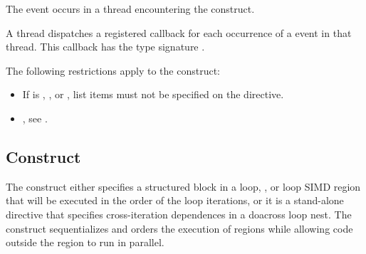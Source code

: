 \events

The  event occurs in a thread encountering the
 construct.

\tools

A thread dispatches a registered  callback
for each occurrence of a  event in that thread. This
callback has the type signature .

\restrictions

The following restrictions apply to the  construct:

\begin{itemize}
\item If  is , , or
    , list items must not be specified on the  directive.
\end{itemize}

\crossreferences
\begin{itemize}
\item {}, see
.
\end{itemize}





\subsection{ Construct}
\label{subsec:ordered Construct}
\summary
The  construct either specifies a structured block in a loop,
, or loop SIMD region that will be executed in the order of the
loop iterations, or it is a stand-alone directive that specifies
cross-iteration dependences in a doacross loop nest. The 
construct sequentializes and orders the execution of  regions
while allowing code outside the region to run in parallel.

